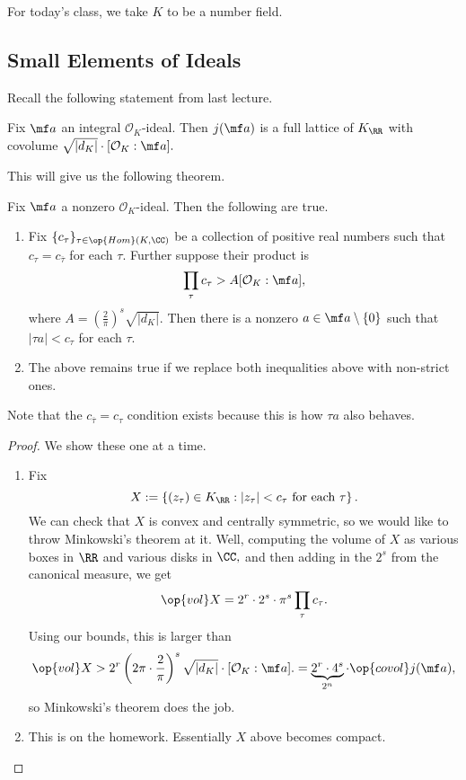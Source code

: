 \documentclass[../notes.tex]{subfiles}
\begin{document}

















For today's class, we take $K$ to be a number field.

\subsection{Small Elements of Ideals}
Recall the following statement from last lecture.
\begin{proposition}
    Fix $\mf a$ an integral $\mathcal O_K$-ideal. Then $j(\mf a)$ is a full lattice of $K_\RR$ with covolume $\sqrt{|d_K|}\cdot[\mathcal O_K:\mf a].$
\end{proposition}
This will give us the following theorem.
\begin{theorem} \label{thm:minkapp}
    Fix $\mf a$ a nonzero $\mathcal O_K$-ideal. Then the following are true.
    \begin{enumerate}[label=(\alph*)]
        \item Fix $\{c_\tau\}_{\tau\in\op{Hom}(K,\CC)}$ be a collection of positive real numbers such that $c_\tau=c_{\overline\tau}$ for each $\tau.$ Further suppose their product is
        \[\prod_\tau c_\tau>A[\mathcal O_K:\mf a],\]
        where $A=\left(\frac2\pi\right)^s\sqrt{|d_K|}.$ Then there is a nonzero $a\in\mf a\setminus\{0\}$ such that $|\tau a|<c_\tau$ for each $\tau.$
        \item The above remains true if we replace both inequalities above with non-strict ones.
    \end{enumerate}
\end{theorem}
Note that the $c_{\overline\tau}=c_\tau$ condition exists because this is how $\tau a$ also behaves.
\begin{proof}
    We show these one at a time.
    \begin{enumerate}[label=(\alph*)]
        \item Fix
        \[X:=\left\{(z_\tau)\in K_\RR:|z_\tau|<c_\tau\text{ for each }\tau\right\}.\]
        We can check that $X$ is convex and centrally symmetric, so we would like to throw Minkowski's theorem at it. Well, computing the volume of $X$ as various boxes in $\RR$ and various disks in $\CC,$ and then adding in the $2^s$ from the canonical measure, we get
        \[\op{vol}X=2^r\cdot2^s\cdot\pi^s\prod_{\tau}c_\tau.\]
        Using our bounds, this is larger than
        \[\op{vol}X>2^r\left(2\pi\cdot\frac{2}\pi\right)^s\sqrt{|d_K|}\cdot[\mathcal O_K:\mf a].=\underbrace{2^r\cdot4^s}_{2^n}\cdot\op{covol}j(\mf a),\]
        so Minkowski's theorem does the job.
        \item This is on the homework. Essentially $X$ above becomes compact.
        \qedhere
    \end{enumerate}
\end{proof}
\end{document}
